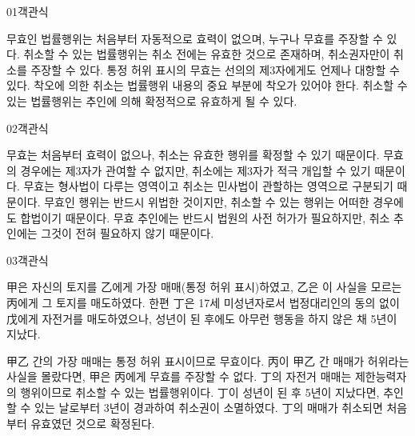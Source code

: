 \documentclass[fs85,seriesWit]{korfarm-base}
\begin{document}
\kfBeginMC
\begin{kfQBlock}{01}{객관식}
\begin{kfChoices}
\kfChoice 무효인 법률행위는 처음부터 자동적으로 효력이 없으며, 누구나 무효를 주장할 수 있다.
\kfChoice 취소할 수 있는 법률행위는 취소 전에는 유효한 것으로 존재하며, 취소권자만이 취소를 주장할 수 있다.
\kfChoice 통정 허위 표시의 무효는 선의의 제3자에게도 언제나 대항할 수 있다.
\kfChoice 착오에 의한 취소는 법률행위 내용의 중요 부분에 착오가 있어야 한다.
\kfChoice 취소할 수 있는 법률행위는 추인에 의해 확정적으로 유효하게 될 수 있다.
\end{kfChoices}
\end{kfQBlock}

\begin{kfQBlock}{02}{객관식}
\begin{kfChoices}
\kfChoice 무효는 처음부터 효력이 없으나, 취소는 유효한 행위를 확정할 수 있기 때문이다.
\kfChoice 무효의 경우에는 제3자가 관여할 수 없지만, 취소에는 제3자가 적극 개입할 수 있기 때문이다.
\kfChoice 무효는 형사법이 다루는 영역이고 취소는 민사법이 관할하는 영역으로 구분되기 때문이다.
\kfChoice 무효인 행위는 반드시 위법한 것이지만, 취소할 수 있는 행위는 어떠한 경우에도 합법이기 때문이다.
\kfChoice 무효 추인에는 반드시 법원의 사전 허가가 필요하지만, 취소 추인에는 그것이 전혀 필요하지 않기 때문이다.
\end{kfChoices}
\end{kfQBlock}

\begin{kfQBlock}{03}{객관식}
\begin{kfEvidence}甲은 자신의 토지를 乙에게 가장 매매(통정 허위 표시)하였고, 乙은 이 사실을 모르는 丙에게 그 토지를 매도하였다. 한편 丁은 17세 미성년자로서 법정대리인의 동의 없이 戊에게 자전거를 매도하였으나, 성년이 된 후에도 아무런 행동을 하지 않은 채 5년이 지났다.\end{kfEvidence}
\begin{kfChoices}
\kfChoice 甲乙 간의 가장 매매는 통정 허위 표시이므로 무효이다.
\kfChoice 丙이 甲乙 간 매매가 허위라는 사실을 몰랐다면, 甲은 丙에게 무효를 주장할 수 없다.
\kfChoice 丁의 자전거 매매는 제한능력자의 행위이므로 취소할 수 있는 법률행위이다.
\kfChoice 丁이 성년이 된 후 5년이 지났다면, 추인할 수 있는 날로부터 3년이 경과하여 취소권이 소멸하였다.
\kfChoice 丁의 매매가 취소되면 처음부터 유효였던 것으로 확정된다.
\end{kfChoices}
\end{kfQBlock}
\end{document}
